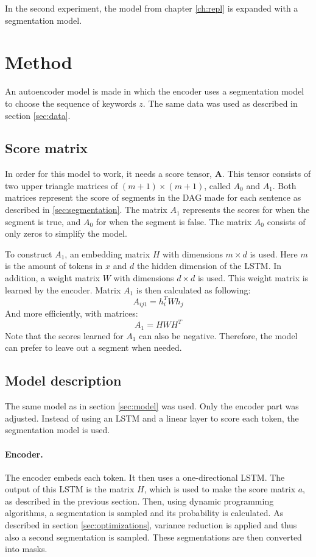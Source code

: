 In the second experiment, the model from chapter \ref{ch:repl} is expanded with a segmentation model. 

\section{Method}
An autoencoder model is made in which the encoder uses a segmentation model to choose the sequence of keywords $z$.
The same data was used as described in section \ref{sec:data}.

\subsection{Score matrix}
In order for this model to work, it needs a score tensor, $\boldsymbol{A}$.
This tensor consists of two upper triangle matrices of $(m+1) \times (m+1)$, called $A_0$ and $A_1$.
Both matrices represent the score of segments in the DAG made for each sentence as described in \ref{sec:segmentation}. 
The matrix $A_1$ represents the scores for when the segment is true, and $A_0$ for when the segment is false.
The matrix $A_0$ consists of only zeros to simplify the model.

To construct $A_1$, an embedding matrix $H$ with dimensions $m \times d$ is used.
Here $m$ is the amount of tokens in $x$ and $d$ the hidden dimension of the LSTM.
In addition, a weight matrix $W$ with dimensions $d \times d$ is used.
This weight matrix is learned by the encoder. 
Matrix $A_1$ is then calculated as following:
\begin{equation}
    A_{ij1} = h_i^T W h_j
\end{equation}
And more efficiently, with matrices:
\begin{equation}
    A_1 = H W H^T
\end{equation}
Note that the scores learned for $A_1$ can also be negative. 
Therefore, the model can prefer to leave out a segment when needed.

\subsection{Model description}
The same model as in section \ref{sec:model} was used. 
Only the encoder part was adjusted.
Instead of using an LSTM and a linear layer to score each token, the segmentation model is used.

\paragraph{Encoder.} The encoder embeds each token. 
It then uses a one-directional LSTM. 
The output of this LSTM is the matrix $H$, which is used to make the score matrix $a$, as described in the previous section. 
Then, using dynamic programming algorithms, a segmentation is sampled and its probability is calculated. 
As described in section \ref{sec:optimizations}, variance reduction is applied and thus also a second segmentation is sampled.
These segmentations are then converted into masks.

